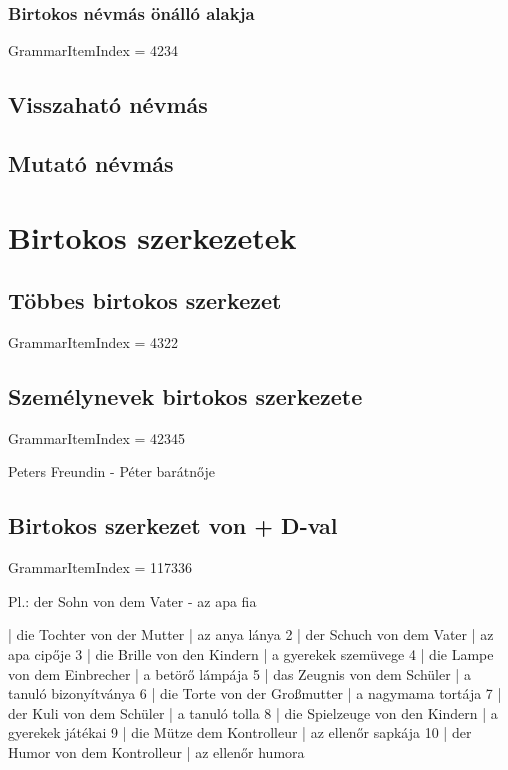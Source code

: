 \documentclass{article}
\newenvironment{desc}{\verbatim}{\endverbatim}
\newenvironment{exmp}{\verbatim}{\endverbatim}
\begin{document}
\subsubsection{Birtokos névmás önálló alakja}

GrammarItemIndex = 4234

\subsection{Visszaható névmás}

\subsection{Mutató névmás}

\section{Birtokos szerkezetek}

\subsection{Többes birtokos szerkezet}

GrammarItemIndex = 4322

\subsection{Személynevek birtokos szerkezete}

GrammarItemIndex = 42345

\begin{desc}
Peters Freundin - Péter barátnője
\end{desc}

\subsection{Birtokos szerkezet von + D-val}

GrammarItemIndex = 117336

\begin{desc}
Pl.: der Sohn von dem Vater - az apa fia
\end{desc}

\begin{exmp}
1 | die Tochter von der Mutter | az anya lánya
2 | der Schuch von dem Vater | az apa cipője
3 | die Brille von den Kindern | a gyerekek szemüvege
4 | die Lampe von dem Einbrecher | a betörő lámpája
5 | das Zeugnis von dem Schüler | a tanuló bizonyítványa
6 | die Torte von der Großmutter | a nagymama tortája
7 | der Kuli von dem Schüler | a tanuló tolla
8 | die Spielzeuge von den Kindern | a gyerekek játékai
9 | die Mütze dem Kontrolleur | az ellenőr sapkája
10 | der Humor von dem Kontrolleur | az ellenőr humora
\end{exmp}
\end{document}
